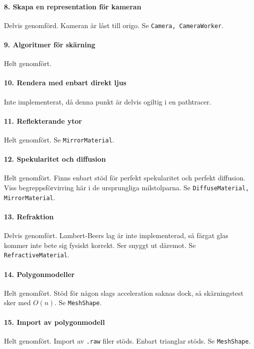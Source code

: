 \documentclass{article}
\begin{document}
\paragraph{8. Skapa en representation för kameran}
Delvis genomförd. Kameran är låst till origo. Se \texttt{Camera,
  CameraWorker}.

\paragraph{9. Algoritmer för skärning}
Helt genomfört.

\paragraph{10. Rendera med enbart direkt ljus}
Inte implementerat, då denna punkt är delvis ogiltig i en pathtracer.

\paragraph{11. Reflekterande ytor}
Helt genomfört. Se \texttt{MirrorMaterial}.

\paragraph{12. Spekularitet och diffusion}
Helt genomfört. Finns enbart stöd för perfekt spekularitet och perfekt
diffusion. Viss begreppsförvirring här i de ursprungliga milstolparna.
Se \texttt{DiffuseMaterial, MirrorMaterial}.

\paragraph{13. Refraktion}
Delvis genomfört. Lambert-Beers lag är inte implementerad, så färgat
glas kommer inte bete sig fysiskt korrekt. Ser snyggt ut däremot.
Se \texttt{RefractiveMaterial}.

\paragraph{14. Polygonmodeller}
Helt genomfört. Stöd för någon slags acceleration saknas dock, så
skärningstest sker med $O(n)$. Se \texttt{MeshShape}.

\paragraph{15. Import av polygonmodell}
Helt genomfört. Import av \texttt{.raw} filer stöds. Enbart trianglar stöds.
Se \texttt{MeshShape}.
\end{document}
